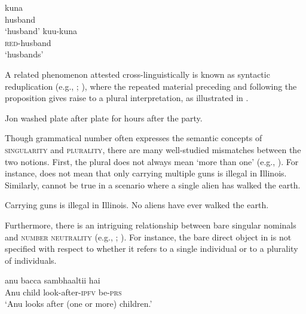 \documentclass[output=paper]{langscibook}
\begin{document}
\ea\label{doc-wag:ex:reduplication}
\ea
\gll kuna\\  
     husband\\
\glt `husband'
\ex \gll kuu-kuna\\  
     \textsc{red}-husband\\ 
\glt `husbands' \hfill \citep[Papago, Uto-Aztecan;][308, adapted]{moravcsik1978reduplicative}
\z
\z

\noindent A related phenomenon attested cross-linguistically is known as syntactic reduplication (e.g., \citealt{travis2001syntax}; ), where the repeated material preceding and following the proposition gives raise to a plural interpretation, as illustrated in .

\ea Jon washed plate after plate for hours after the party. \hfill \citep[457]{travis2001syntax}\label{doc-wag:ex:syntactic-reduplication}
\z 

\noindent Though grammatical number often expresses the semantic concepts of \textsc{singularity} and \textsc{plurality}, there are many well-studied mismatches between the two notions. %
First, the plural does not always mean `more than one' (e.g., \citealt{sauerland2003new, spector2007aspects, zweig2009number}). For instance,  does not mean that only carrying multiple guns is illegal in Illinois. Similarly,  cannot be true in a scenario where a single alien has walked the earth.

\ea \ea Carrying guns is illegal in Illinois.\label{doc-wag:ex:mismatch-guns} 
\ex No aliens have ever walked the earth.\hfill \citep[267]{nouwen2016plurality}\label{doc-wag:ex:mismatch-aliens}
\z
\z

\noindent Furthermore, there is an intriguing relationship between bare singular nominals and \textsc{number neutrality} (e.g., \citealt{rullmann_you2006general, dayal2011hindi}; ). For instance, the bare direct object in  is not specified with respect to whether it refers to a single individual or to a plurality of individuals.

\ea \gll anu bacca sambhaaltii hai\\
Anu child look-after-\textsc{ipfv} be-\textsc{prs}\\
\glt `Anu looks after (one or more) children.' \hfill \citep[Hindi;][127, adapted]{dayal2011hindi}\label{doc-wag:ex:bare}
\z
\end{document}

